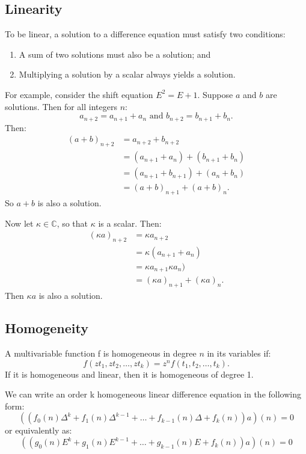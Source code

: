 \documentclass[12pt,letterpaper,reqno]{amsart}
\numberwithin{equation}{section}
\numberwithin{theorem}{section}
\numberwithin{table}{section}
\begin{document}
\subsection{Linearity}

To be linear, a solution to a difference equation must satisfy two conditions:
\begin{enumerate}
	\item A sum of two solutions must also be a solution; and
	\item Multiplying a solution by a scalar always yields a solution.
\end{enumerate}

For example, consider the shift equation $E^2=E+1$.  Suppose $a$ and $b$ are solutions. Then for all integers $n$:
\[
	a_{n+2} = a_{n+1} + a_n
	\text{ and }
	b_{n+2} = b_{n+1} + b_n
	\text{.}
\]
Then:
\begin{align*}
	(a+b)_{n+2} &= a_{n+2} + b_{n+2} \\
				&= (a_{n+1} + a_n) + (b_{n+1} + b_n) \\
				&= (a_{n+1} + b_{n+1}) + (a_n + b_n) \\
				&= (a+b)_{n+1} + (a+b)_n
				\text{.}
\end{align*}
So $a+b$ is also a solution.

Now let $\kappa\in\mathbb{C}$, so that $\kappa$ is a scalar.  Then:
\begin{align*}
	(\kappa a)_{n+2} &= \kappa a_{n+2} \\
	&= \kappa(a_{n+1} + a_n) \\
	&= \kappa a_{n+1} \kappa a_n) \\
	&= (\kappa a)_{n+1} + (\kappa a)_n
	\text{.}
\end{align*}
Then $\kappa a$ is also a solution.

\subsection{Homogeneity}

A multivariable function f is homogeneous in degree $n$ in its variables if:
\[
	f(zt_1, zt_2, \dots, zt_k) = z^nf(t_1, t_2, \dots, t_k)
	\text{.}
\]
If it is homogeneous and linear, then it is homogeneous of degree 1.

We can write an order k homogeneous linear difference equation in the following form:
\[
	((f_0(n) \Delta^k + f_1(n) \Delta^{k-1} + \dots + f_{k-1}(n)\Delta + f_k(n))a)(n) = 0
\]
or equivalently as:
\[
	((g_0(n) E^k + g_1(n) E^{k-1} + \dots + g_{k-1}(n)E + f_k(n))a)(n) = 0
\]
\end{document}

